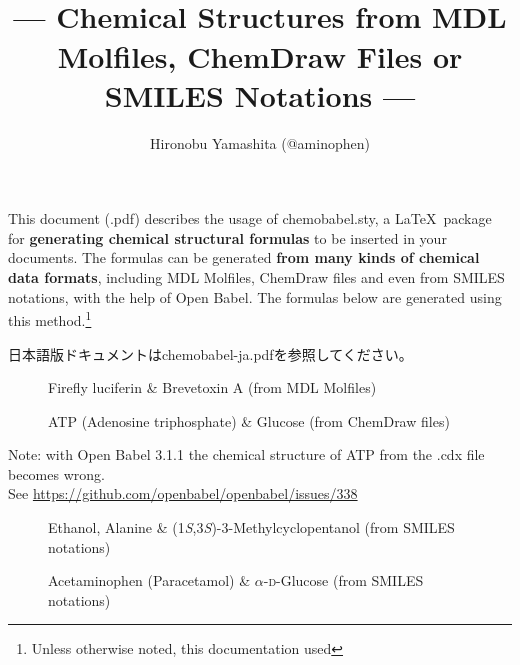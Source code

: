 \documentclass[12pt]{ltjsarticle}
\title{\Lpack{chemobabel} \\[1ex]
  \normalsize --- Chemical Structures from MDL Molfiles,
  ChemDraw Files or SMILES Notations --- \\
  }
\author{Hironobu Yamashita (@aminophen)}
\def\Lpack#1{\textsf{#1}}
\def\Lcode#1{\texttt{#1}}
\begin{document}
\renewcommand{\figurename}{Fig.\,}
\maketitle

This document (\jobname.pdf) describes the usage of \Lpack{chemobabel.sty},
a \LaTeX\ package for \textbf{generating chemical structural formulas}
to be inserted in your documents.
The formulas can be generated \textbf{from many kinds of chemical data
formats}, including MDL Molfiles, ChemDraw files and even from
SMILES notations, with the help of Open Babel.
The formulas below are generated using this method.\footnote{Unless
otherwise noted, this documentation used \Lcode{}}

日本語版ドキュメントはchemobabel-ja.pdfを参照してください。

\begin{figure}[ht]
  \centering
   \quad
  \caption{Firefly luciferin \& Brevetoxin A (from MDL Molfiles)}
\end{figure}

\begin{figure}[ht]
  \centering
   \hspace{1cm}
  \caption{ATP (Adenosine triphosphate) \& Glucose (from ChemDraw files)}
\end{figure}
\begin{center}\small
Note: with Open Babel 3.1.1 the chemical structure of ATP from the .cdx file
becomes wrong.\\ See \url{https://github.com/openbabel/openbabel/issues/338}
\end{center}

\begin{figure}[ht]
  \centering
   \hspace{1cm}
   \hspace{1cm}
  \caption{Ethanol, Alanine \& (1\textit{S},3\textit{S})-3-Methylcyclopentanol (from SMILES notations)}
\end{figure}

\begin{figure}[ht]
  \centering
   \hspace{1cm}
  \caption{Acetaminophen (Paracetamol) \& $\alpha$-\textsc{d}-Glucose (from SMILES notations)}
\end{figure}
\end{document}
